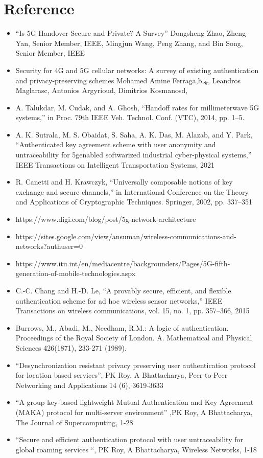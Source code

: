 \chapter*{Reference}

\begin{itemize}
    \item “Is 5G Handover Secure and Private? A Survey” Dongsheng Zhao, Zheng Yan, Senior Member, IEEE, Mingjun Wang, Peng Zhang, and Bin Song, Senior Member, IEEE
    \item Security for 4G and 5G cellular networks: A survey of existing authentication and privacy-preserving schemes Mohamed Amine Ferraga,b,⁎, Leandros Maglarasc, Antonios Argyrioud, Dimitrios Kosmanosd,
    \item A. Talukdar, M. Cudak, and A. Ghosh, “Handoff rates for millimeterwave 5G systems,” in Proc. 79th IEEE Veh. Technol. Conf. (VTC), 2014, pp. 1–5.
    \item A. K. Sutrala, M. S. Obaidat, S. Saha, A. K. Das, M. Alazab, and Y. Park, “Authenticated key agreement scheme with user anonymity and untraceability for 5genabled softwarized industrial cyber-physical systems,” IEEE Transactions on Intelligent Transportation Systems, 2021
    \item R. Canetti and H. Krawczyk, “Universally composable notions of key exchange and secure channels,” in International Conference on the Theory and Applications of Cryptographic Techniques. Springer, 2002, pp. 337–351
    \item https://www.digi.com/blog/post/5g-network-architecture
    \item https://sites.google.com/view/ansuman/wireless-communications-and-networks?authuser=0
    \item https://www.itu.int/en/mediacentre/backgrounders/Pages/5G-fifth-generation-of-mobile-technologies.aspx
    \item C.-C. Chang and H.-D. Le, “A provably secure, efficient, and flexible authentication scheme for ad hoc wireless sensor networks,” IEEE Transactions on wireless communications, vol. 15, no. 1, pp. 357–366, 2015
    \item Burrows, M., Abadi, M., Needham, R.M.: A logic of authentication. Proceedings of the Royal Society of London. A. Mathematical and Physical Sciences 426(1871), 233-271 (1989).
    \item “Desynchronization resistant privacy preserving user authentication protocol for location based services”, PK Roy, A Bhattacharya, Peer-to-Peer Networking and Applications 14 (6), 3619-3633
    \item “A group key-based lightweight Mutual Authentication and Key Agreement (MAKA) protocol for multi-server environment” ,PK Roy, A Bhattacharya, The Journal of Supercomputing, 1-28
    \item “Secure and efficient authentication protocol with user untraceability for global roaming services “, PK Roy, A Bhattacharya, Wireless Networks, 1-18

\end{itemize}